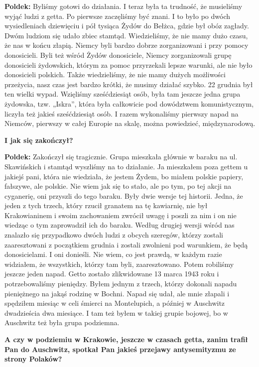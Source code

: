 \textbf{Poldek:} Byliśmy gotowi do działania. I teraz była ta trudność, że musieliśmy wyjąć ludzi z getta. Po pierwsze zaczęliśmy być znani. I to było po dwóch wysiedleniach dziewięciu i pół tysiąca Żydów do Bełżca, gdzie był obóz zagłady. Dwóm ludziom się udało zbiec stamtąd. Wiedzieliśmy, że nie mamy dużo czasu, że nas w końcu złapią. Niemcy byli bardzo dobrze zorganizowani i przy pomocy donosicieli. Byli też wśród Żydów donosiciele, Niemcy zorganizowali grupę donosicieli żydowskich, którym za pomoc przyrzekali lepsze warunki, ale nie było donosicieli polskich. Także wiedzieliśmy, że nie mamy dużych możliwości przeżycia, nasz czas jest bardzo krótki, że musimy działać szybko. 22 grudnia był ten wielki wypad. Wzięliśmy sześćdziesiąt osób, była tam jeszcze jedna grupa żydowska, tzw. „Iskra”, która była całkowicie pod dowództwem komunistycznym, liczyła też jakieś sześćdziesiąt osób. I razem wykonaliśmy pierwszy napad na Niemców, pierwszy w całej Europie na skalę, można powiedzieć, międzynarodową.\par 
\textbf{I jak się zakończył?}\par
\textbf{Poldek:} Zakończył się tragicznie. Grupa mieszkała głównie w baraku na ul. Skawińskich i stamtąd wyszliśmy na to działanie. Ja mieszkałem poza gettem u jakiejś pani, która nie wiedziała, że jestem Żydem, bo miałem polskie papiery, fałszywe, ale polskie.  Nie wiem jak się to stało, ale po tym, po tej akcji na cyganerię, oni przyszli do tego baraku. Były dwie wersje tej historii. Jedna, że jeden z tych trzech, który rzucił granatem na tę kawiarnię, nie był Krakowianinem i swoim zachowaniem zwrócił uwagę i poszli za nim i on nie wiedząc o tym zaprowadził ich do baraku. Według drugiej wersji wśród nas znalazło się przypadkowo dwóch ludzi z obcych szeregów, którzy zostali zaaresztowani z początkiem grudnia i zostali zwolnieni pod warunkiem, że będą donosicielami. I oni donieśli. Nie wiem, co jest prawdą, w każdym razie widziałem, że wszystkich, którzy tam byli, zaaresztowano. Potem robiliśmy jeszcze jeden napad. Getto zostało zlikwidowane 13 marca 1943 roku i potrzebowaliśmy pieniędzy. Byłem jednym z trzech, którzy dokonali napadu pieniężnego na jakąś rodzinę w Bochni. Napad się udał, ale mnie złapali i spędziłem miesiąc w celi śmierci na Montelupich, a później w Auschwitz dwadzieścia dwa miesiące. I tam też byłem w takiej grupie bojowej, bo w Auschwitz też była grupa podziemna.\par  
\textbf{A czy w podziemiu w Krakowie, jeszcze w czasach getta, zanim trafił Pan do Auschwitz, spotkał Pan jakieś przejawy antysemityzmu ze strony Polaków?}\par
